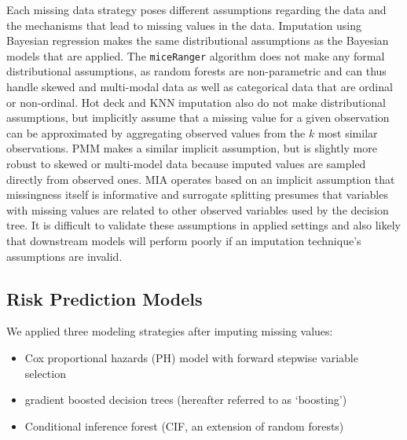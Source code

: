 \documentclass{article}
\begin{document}
Each missing data strategy poses different assumptions regarding the
data and the mechanisms that lead to missing values in the data.
Imputation using Bayesian regression makes the same distributional
assumptions as the Bayesian models that are applied. The
\texttt{miceRanger} algorithm does not make any formal distributional
assumptions, as random forests are non-parametric and can thus handle
skewed and multi-modal data as well as categorical data that are ordinal
or non-ordinal. Hot deck and KNN imputation also do not make
distributional assumptions, but implicitly assume that a missing value
for a given observation can be approximated by aggregating observed
values from the \(k\) most similar observations. PMM makes a similar
implicit assumption, but is slightly more robust to skewed or
multi-model data because imputed values are sampled directly from
observed ones. MIA operates based on an implicit assumption that
missingness itself is informative and surrogate splitting presumes that
variables with missing values are related to other observed variables
used by the decision tree. It is difficult to validate these assumptions
in applied settings and also likely that downstream models will perform
poorly if an imputation technique's assumptions are invalid.

\hypertarget{risk-prediction-models}{%
\subsection{Risk Prediction Models}\label{risk-prediction-models}}

\label{subsec:modeling}

We applied three modeling strategies after imputing missing values:

\begin{itemize}
\tightlist
\item
  Cox proportional hazards (PH) model with forward stepwise variable
  selection
\item
  gradient boosted decision trees (hereafter referred to as `boosting')
\item
  Conditional inference forest (CIF, an extension of random forests)
\end{itemize}
\end{document}

